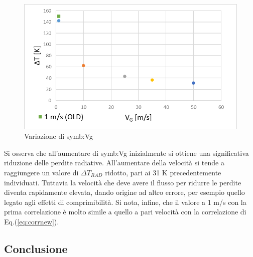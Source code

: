 \begin{figure}[H]
	\centering
	\includegraphics[width=0.7\linewidth]{"../sperimentazione nei propulsori/varV"}
	\caption{Variazione di \gls{symb:Vg}}
	\label{fig:varv}
\end{figure}

Si osserva che all'aumentare di \gls{symb:Vg} inizialmente si ottiene una significativa riduzione delle perdite radiative. All'aumentare della velocità si tende a raggiungere un valore di $\Delta T_{\textit{RAD}}$ ridotto, pari ai 31 K precedentemente individuati. Tuttavia la velocità che deve avere il flusso per ridurre le perdite diventa rapidamente elevata, dando origine ad altro errore, per esempio quello legato agli effetti di comprimibilità. Si nota, infine, che il valore a 1 m/s con la prima correlazione è molto simile a quello a pari velocità con la correlazione di Eq.(\ref{eq:corrnew}).

\subsection{Conclusione}
